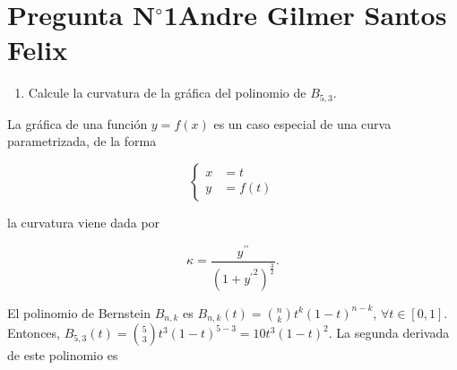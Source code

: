 \section{Pregunta N$^{\circ}$1\qquad Andre Gilmer Santos Felix}

\begin{frame}
    \begin{enumerate}\setcounter{enumi}{0}
        \item

              Calcule la curvatura de la gráfica del polinomio de
              $B_{5,3}$.
    \end{enumerate}

    \begin{solution}
        La gráfica de una función $y=f\left(x\right)$ es un caso
        especial de una curva parametrizada, de la forma

        \begin{equation*}
            \begin{cases}
                x & =t               \\
                y & =f\left(t\right)
            \end{cases}
        \end{equation*}

        la curvatura viene dada por

        \begin{equation*}
            \kappa=
            \dfrac{
                y^{\prime\prime}
            }{
                {\left(1+{y^{\prime}}^{2}\right)}^{\frac{3}{2}}
            }.
        \end{equation*}

        El polinomio de Bernstein $B_{n,k}$ es
        \begin{math}
            B_{n,k}\left(t\right)=
            \binom{n}{k}
            t^{k}
            \left(1-t\right)^{n-k}
        \end{math},
        $\forall t\in\left[0,1\right]$.
        Entonces,
        \begin{math}
            B_{5,3}\left(t\right)=
            \binom{5}{3}
            t^{3}
            \left(1-t\right)^{5-3}=
            10t^{3}{\left(1-t\right)}^{2}.
        \end{math}
        La segunda derivada de este polinomio es
    \end{solution}
\end{frame}

